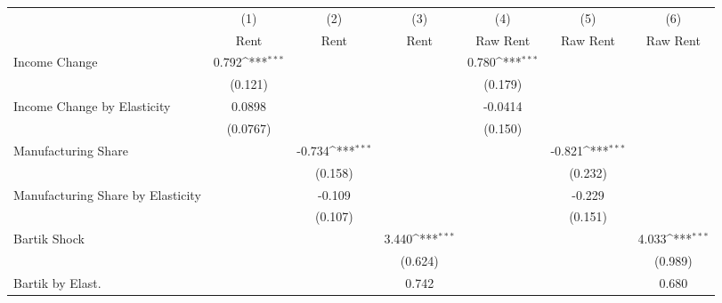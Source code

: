{
\def\sym#1{\ifmmode^{#1}\else\(^{#1}\)\fi}
\begin{tabular}{l*{6}{c}}
\hline\hline
                    &\multicolumn{1}{c}{(1)}&\multicolumn{1}{c}{(2)}&\multicolumn{1}{c}{(3)}&\multicolumn{1}{c}{(4)}&\multicolumn{1}{c}{(5)}&\multicolumn{1}{c}{(6)}\\
                    &\multicolumn{1}{c}{Rent}&\multicolumn{1}{c}{Rent}&\multicolumn{1}{c}{Rent}&\multicolumn{1}{c}{Raw Rent}&\multicolumn{1}{c}{Raw Rent}&\multicolumn{1}{c}{Raw Rent}\\
\hline
Income Change       &       0.792\sym{***}&                     &                     &       0.780\sym{***}&                     &                     \\
                    &     (0.121)         &                     &                     &     (0.179)         &                     &                     \\
[1em]
Income Change by Elasticity&      0.0898         &                     &                     &     -0.0414         &                     &                     \\
                    &    (0.0767)         &                     &                     &     (0.150)         &                     &                     \\
[1em]
Manufacturing Share &                     &      -0.734\sym{***}&                     &                     &      -0.821\sym{***}&                     \\
                    &                     &     (0.158)         &                     &                     &     (0.232)         &                     \\
[1em]
Manufacturing Share by Elasticity&                     &      -0.109         &                     &                     &      -0.229         &                     \\
                    &                     &     (0.107)         &                     &                     &     (0.151)         &                     \\
[1em]
Bartik Shock        &                     &                     &       3.440\sym{***}&                     &                     &       4.033\sym{***}\\
                    &                     &                     &     (0.624)         &                     &                     &     (0.989)         \\
[1em]
Bartik by Elast.    &                     &                     &       0.742         &                     &                     &       0.680         \\

\end{tabular}}
